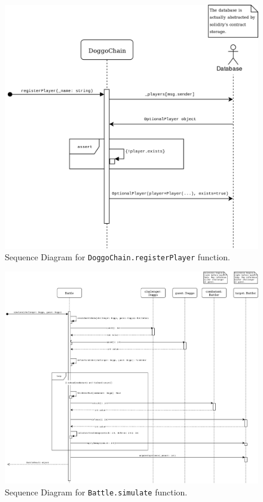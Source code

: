 \documentclass{article}
\begin{document}
    \begin{figure}[h]
        \centering{}
        \includegraphics[width=1\textwidth]{img/DoggoChain - registerPlayer SD}
        \caption{%
            Sequence Diagram for \texttt{DoggoChain.registerPlayer}
            function.~\label{fig:registerPlayerSD}
        }
    \end{figure}

    \begin{figure}[h]
        \centering{}
        \includegraphics[width=1\textwidth]{img/DoggoChain - simulate SD}
        \caption{%
            Sequence Diagram for \texttt{Battle.simulate}
            function.~\label{fig:simulateSD}
        }
    \end{figure}
\end{document}
